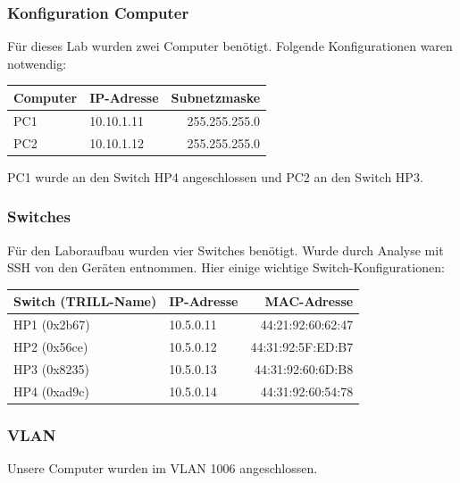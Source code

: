 \documentclass[a4,12pt]{scrartcl}
\begin{document}
\subsubsection{Konfiguration Computer}
Für dieses Lab wurden zwei Computer benötigt. Folgende Konfigurationen waren notwendig: 
\begin{center}
    \begin{tabular}{@{} l l r@{}}\toprule    
    {Computer} & {IP-Adresse} & {Subnetzmaske}\\ \midrule
    PC1 & 10.10.1.11 & 255.255.255.0\\ \addlinespace
    PC2 & 10.10.1.12 & 255.255.255.0\\ 
    \bottomrule
    \end{tabular}
\end{center}

\noindent PC1 wurde an den Switch HP4 angeschlossen und PC2 an den Switch HP3. 

\subsubsection{Switches}
Für den Laboraufbau wurden vier Switches benötigt. Wurde durch Analyse mit SSH von den Geräten entnommen. Hier einige wichtige Switch-Konfigurationen: 
\begin{center}
    \begin{tabular}{@{} l l r@{}}\toprule    
    {Switch (TRILL-Name)} & {IP-Adresse} & {MAC-Adresse}\\ \midrule
    HP1 (0x2b67) & 10.5.0.11 & 44:21:92:60:62:47\\ \addlinespace
    HP2 (0x56ce) & 10.5.0.12 & 44:31:92:5F:ED:B7\\ \addlinespace
    HP3 (0x8235) & 10.5.0.13 & 44:31:92:60:6D:B8\\ \addlinespace
    HP4 (0xad9c) & 10.5.0.14 & 44:31:92:60:54:78\\
    \bottomrule
    \end{tabular}
\end{center}

\subsubsection{VLAN}
Unsere Computer wurden im VLAN 1006 angeschlossen. 
\end{document}
